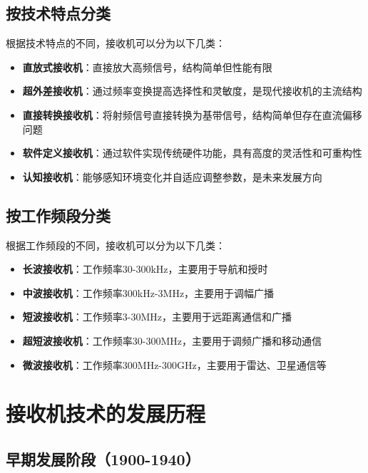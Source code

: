 \documentclass[12pt,UTF8]{ctexbook}
\begin{document}
\subsection{按技术特点分类}

根据技术特点的不同，接收机可以分为以下几类：

\begin{itemize}[leftmargin=3.5em]
    \item \textbf{直放式接收机}：直接放大高频信号，结构简单但性能有限
    \item \textbf{超外差接收机}：通过频率变换提高选择性和灵敏度，是现代接收机的主流结构
    \item \textbf{直接转换接收机}：将射频信号直接转换为基带信号，结构简单但存在直流偏移问题
    \item \textbf{软件定义接收机}：通过软件实现传统硬件功能，具有高度的灵活性和可重构性
    \item \textbf{认知接收机}：能够感知环境变化并自适应调整参数，是未来发展方向
\end{itemize}

\subsection{按工作频段分类}

根据工作频段的不同，接收机可以分为以下几类：

\begin{itemize}[leftmargin=3.5em]
    \item \textbf{长波接收机}：工作频率30-300kHz，主要用于导航和授时
    \item \textbf{中波接收机}：工作频率300kHz-3MHz，主要用于调幅广播
    \item \textbf{短波接收机}：工作频率3-30MHz，主要用于远距离通信和广播
    \item \textbf{超短波接收机}：工作频率30-300MHz，主要用于调频广播和移动通信
    \item \textbf{微波接收机}：工作频率300MHz-300GHz，主要用于雷达、卫星通信等
\end{itemize}

\section{接收机技术的发展历程}

\subsection{早期发展阶段（1900-1940）}
\end{document}
